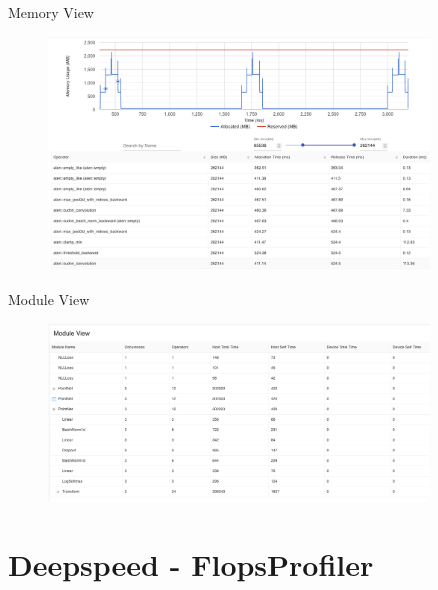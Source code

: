 \documentclass[compress,aspectratio=169]{beamer}
\begin{document}
\begin{frame}{Memory View}
    \vspace{-1em}
\begin{center}
    \begin{figure}
        \includegraphics[width=0.9\textwidth]{../../data/scap_gtx1080_profiler-torch_batch-size-64_14650758_memory-view}
    \end{figure}
    \end{center}
\end{frame}

\begin{frame}{Module View}
    \vspace{-1em}
\begin{center}
    \begin{figure}
        \includegraphics[width=0.9\textwidth]{../../data/scap_gtx1080_profiler-torch_batch-size-64_14650758_module-view}
    \end{figure}
    \end{center}
\end{frame}


\section{Deepspeed - FlopsProfiler}
\end{document}
